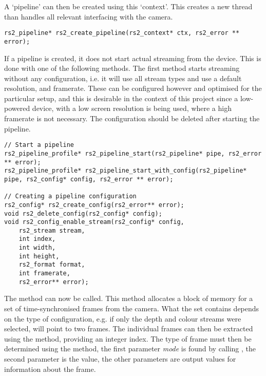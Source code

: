     A `pipeline' can then be created using this `context'. This creates a new thread than handles all relevant interfacing with the camera.

    \begin{lstlisting}[style=CStyle]
rs2_pipeline* rs2_create_pipeline(rs2_context* ctx, rs2_error ** error);\end{lstlisting}   

    If a pipeline is created, it does not start actual streaming from the device. This is done with one of the following methods. The first method starts streaming without any configuration, i.e. it will use all stream types and use a default resolution, and framerate. These can be configured however and optimised for the particular setup, and this is desirable in the context of this project since a low-powered device, with a low screen resolution is being used, where a high framerate is not necessary. The configuration should be deleted after starting the pipeline.

    \begin{lstlisting}[style=CStyle]
// Start a pipeline
rs2_pipeline_profile* rs2_pipeline_start(rs2_pipeline* pipe, rs2_error ** error);
rs2_pipeline_profile* rs2_pipeline_start_with_config(rs2_pipeline* pipe, rs2_config* config, rs2_error ** error);

// Creating a pipeline configuration
rs2_config* rs2_create_config(rs2_error** error);
void rs2_delete_config(rs2_config* config);
void rs2_config_enable_stream(rs2_config* config,
    rs2_stream stream,
    int index,
    int width,
    int height,
    rs2_format format,
    int framerate,
    rs2_error** error);\end{lstlisting}

    The  method can now be called. This method allocates a block of memory for a set of time-synchronised frames from the camera. What the set contains depends on the type of configuration, e.g. if only the depth and colour streams were selected,  will point to two frames. The individual frames can then be extracted using the  method, providing an integer index. The type of frame must then be determined using the  method, the first parameter {\slshape mode} is found by calling , the second parameter is the  value, the other parameters are output values for information about the frame.

